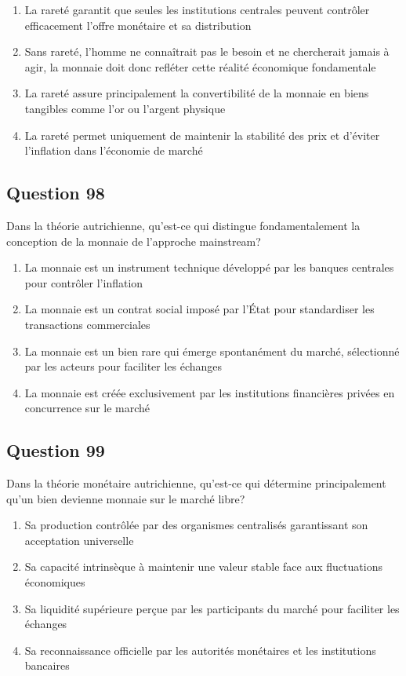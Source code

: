 \documentclass[12pt,a4paper]{article}
\begin{document}
\begin{enumerate}[label=\Alph*., leftmargin=*]
\item La rareté garantit que seules les institutions centrales peuvent contrôler efficacement l'offre monétaire et sa distribution
\item Sans rareté, l'homme ne connaîtrait pas le besoin et ne chercherait jamais à agir, la monnaie doit donc refléter cette réalité économique fondamentale
\item La rareté assure principalement la convertibilité de la monnaie en biens tangibles comme l'or ou l'argent physique
\item La rareté permet uniquement de maintenir la stabilité des prix et d'éviter l'inflation dans l'économie de marché
\end{enumerate}

\bigskip


\subsection*{Question 98}
Dans la théorie autrichienne, qu'est-ce qui distingue fondamentalement la conception de la monnaie de l'approche mainstream?

\begin{enumerate}[label=\Alph*., leftmargin=*]
\item La monnaie est un instrument technique développé par les banques centrales pour contrôler l'inflation
\item La monnaie est un contrat social imposé par l'État pour standardiser les transactions commerciales
\item La monnaie est un bien rare qui émerge spontanément du marché, sélectionné par les acteurs pour faciliter les échanges
\item La monnaie est créée exclusivement par les institutions financières privées en concurrence sur le marché
\end{enumerate}

\bigskip


\subsection*{Question 99}
Dans la théorie monétaire autrichienne, qu'est-ce qui détermine principalement qu'un bien devienne monnaie sur le marché libre?

\begin{enumerate}[label=\Alph*., leftmargin=*]
\item Sa production contrôlée par des organismes centralisés garantissant son acceptation universelle
\item Sa capacité intrinsèque à maintenir une valeur stable face aux fluctuations économiques
\item Sa liquidité supérieure perçue par les participants du marché pour faciliter les échanges
\item Sa reconnaissance officielle par les autorités monétaires et les institutions bancaires
\end{enumerate}
\end{document}
